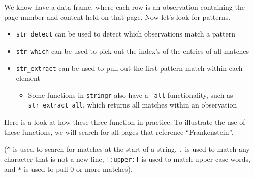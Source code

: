 \documentclass[]{article}
\newenvironment{Shaded}{\begin{snugshade}}{\end{snugshade}}
\newcommand{\KeywordTok}[1]{\textcolor[rgb]{0.13,0.29,0.53}{\textbf{#1}}}
\newcommand{\NormalTok}[1]{#1}
\newcommand{\OperatorTok}[1]{\textcolor[rgb]{0.81,0.36,0.00}{\textbf{#1}}}
\newcommand{\StringTok}[1]{\textcolor[rgb]{0.31,0.60,0.02}{#1}}
\providecommand{\tightlist}{%
  \setlength{\itemsep}{0pt}\setlength{\parskip}{0pt}}
\begin{document}
We know have a data frame, where each row is an observation containing
the page number and content held on that page. Now let's look for
patterns.

\begin{itemize}
\tightlist
\item
  \texttt{str\_detect} can be used to detect which observations match a
  pattern
\item
  \texttt{str\_which} can be used to pick out the index's of the entries
  of all matches
\item
  \texttt{str\_extract} can be used to pull out the first pattern match
  within each element

  \begin{itemize}
  \tightlist
  \item
    Some functions in \texttt{stringr} also have a \texttt{\_all}
    functionality, such as \texttt{str\_extract\_all}, which returns all
    matches within an observation
  \end{itemize}
\end{itemize}

Here is a look at how these three function in practice. To illustrate
the use of these functions, we will search for all pages that reference
``Frankenstein''.

(\texttt{\^{}} is used to search for matches at the start of a string,
\texttt{.} is used to match any character that is not a new line,
\texttt{{[}:upper:{]}} is used to match upper case words, and \texttt{*}
is used to pull 0 or more matches).

\begin{Shaded}
\end{Shaded}
\end{document}
